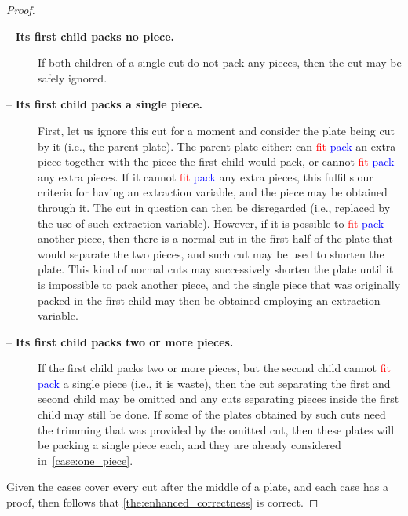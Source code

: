 \documentclass[ppgc,tese,english,formais,babel]{iiufrgs}
\newif\iffinalversion
\newcommand{\newtext}[1]{\iffinalversion%
#1%
\else%
\textcolor{blue}{#1}%
\fi%
}
\newcommand{\oldtext}[1]{\iffinalversion%
\else%
\textcolor{red}{#1}%
\fi%
}
\begin{document}
\begin{proof}
\begin{description}
\item[ -- \textbf{Its first child packs no piece.}]
If both children of a single cut do not pack any pieces, then the cut may be safely ignored.
\item[ -- \textbf{Its first child packs a single piece.}]
First, let us ignore this cut for a moment and consider the plate being cut by it (i.e., the parent plate).
The parent plate either: can \oldtext{fit}\newtext{pack} an extra piece together with the piece the first child would pack, or cannot \oldtext{fit}\newtext{pack} any extra pieces.
If it cannot \oldtext{fit}\newtext{pack} any extra pieces, this fulfills our criteria for having an extraction variable, and the piece may be obtained through it.
The cut in question can then be disregarded (i.e., replaced by the use of such extraction variable).
However, if it is possible to \oldtext{fit}\newtext{pack} another piece, then there is a normal cut in the first half of the plate that would separate the two pieces, and such cut may be used to shorten the plate.
This kind of normal cuts may successively shorten the plate until it is impossible to pack another piece, and the single piece that was originally packed in the first child may then be obtained employing an extraction variable.
\item[ -- \textbf{Its first child packs two or more pieces.}]
If the first child packs two or more pieces, but the second child cannot \oldtext{fit}\newtext{pack} a single piece (i.e., it is waste), then the cut separating the first and second child may be omitted and any cuts separating pieces inside the first child may still be done.
If some of the plates obtained by such cuts need the trimming that was provided by the omitted cut, then these plates will be packing a single piece each, and they are already considered in~\cref{case:one_piece}.
\end{description}

Given the cases cover every cut after the middle of a plate, and each case has a proof, then follows that \cref{the:enhanced_correctness} is correct.

\end{proof}
\end{document}
